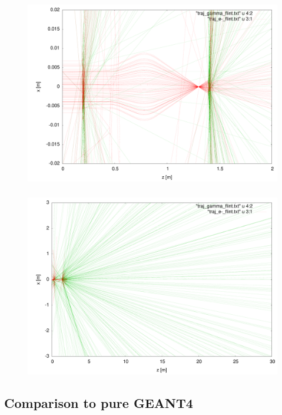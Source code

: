 \documentclass{beamer}
\newcommand{\ident}{\thesection.\thesubsection}
\newcommand{\mysubsection}[1]{\subsection{#1}\label{\ident}}
\newcommand{\ftitle}{\frametitle{\nameref{\ident}}}
\newcommand{\geant}{G{\smaller EANT}4 }
\begin{document}
\begin{frame}
	\ftitle
	\begin{figure}
		\includegraphics[height=0.8\textheight]{img/quadrupole_flint}
	\end{figure}
\end{frame}

\begin{frame}
	\ftitle
	\begin{figure}
		\includegraphics[height=0.8\textheight]{img/quadrupole_gamma}
	\end{figure}
\end{frame}

\mysubsection{Comparison to pure \geant}
\end{document}
